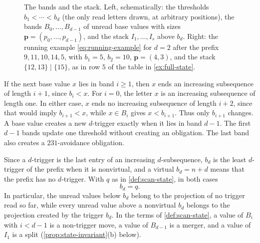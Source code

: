 \documentclass[11pt,reqno]{amsart}
\theoremstyle{definition}
\theoremstyle{remark}
\begin{document}
\begin{figure}[tb]
\begin{minipage}[b]{0.57\textwidth}
\end{minipage}
\caption{The bands and the stack.  Left, schematically: the thresholds
$b_1<\cdots<b_d$ (the only read letters drawn, at arbitrary positions),
the bands $B_0,\ldots,B_{d-1}$ of unread base values with sizes
$\mathbf p=(p_0,\ldots,p_{d-1})$, and the stack $I_1,\ldots,I_s$ above
$b_d$.  Right: the running example \eqref{eq:running-example} for $d=2$
after the prefix $9,11,10,14,5$, with $b_1=5$, $b_2=10$,
$\mathbf p=(4,3)$, and the stack $\{12,13\}\mid\{15\}$, as in row $5$ of the
table in \cref{ex:full-state}.}
\label{fig:bands}
\end{figure}

If the next base value $x$ lies in band $i\geq1$, then $x$ ends an increasing
subsequence of length $i+1$, since $b_i<x$.  For $i=0$, the letter $x$ is an
increasing subsequence of length one.  In either case, $x$ ends no increasing
subsequence of length $i+2$, since that would imply $b_{i+1}<x$, while
$x\in B_i$ gives $x<b_{i+1}$.  Thus only
$b_{i+1}$ changes.  A base value creates a new $d$-trigger exactly when it
lies in band $d-1$.  The first $d-1$ bands update one threshold without
creating an obligation.  The last band also creates a $231$-avoidance
obligation.

Since a $d$-trigger is the last entry of an increasing $d$-subsequence,
$b_d$ is the least $d$-trigger of the prefix when it is nonvirtual, and a
virtual $b_d=n+d$ means that the prefix has no $d$-trigger.  With $q$ as in
\cref{def:scan-state}, in both cases
\begin{equation}\label{eq:bd-q}
 b_d=q.
\end{equation}
In particular, the unread values below $b_d$ belong to the projection of no
trigger read so far, while every unread value above a nonvirtual $b_d$
belongs to the projection created by the trigger $b_d$.  In the terms of
\cref{def:scan-state}, a value of $B_i$ with $i<d-1$ is a non-trigger move,
a value of $B_{d-1}$ is a merger, and a value of $I_1$ is a split
(\cref{prop:state-invariant}(b) below).
\end{document}
